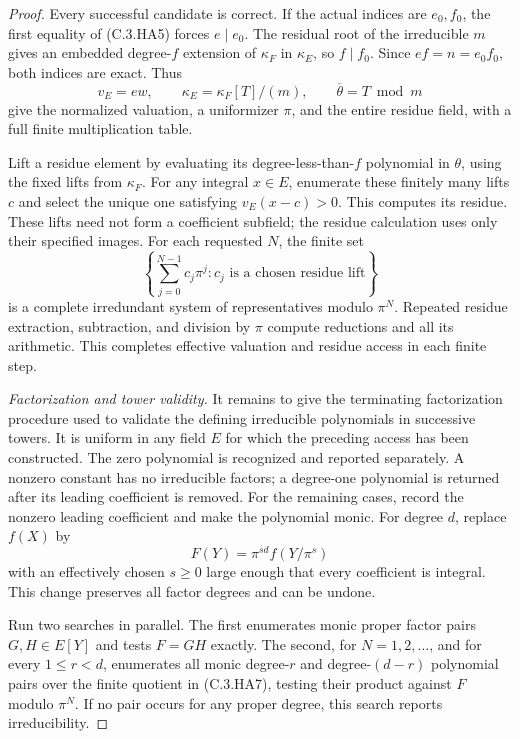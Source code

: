 \begin{proof}
Every successful candidate is correct.
If the actual indices are $e_0,f_0$,
the first equality of (C.3.HA5)
forces $e\mid e_0$.
The residual root of the irreducible
$m$ gives an embedded degree-$f$
extension of $\kappa_F$ in $\kappa_E$,
so $f\mid f_0$.
Since $ef=n=e_0f_0$, both indices
are exact.  Thus
\[
 v_E=e w,\qquad
 \kappa_E=\kappa_F[T]/(m),\qquad
 \overline\theta=T\bmod m                              \tag{C.3.HA6}
\]
give the normalized valuation, a
uniformizer $\pi$, and the entire
residue field, with a full finite
multiplication table.

Lift a residue element by evaluating
its degree-less-than-$f$ polynomial
in $\theta$, using the fixed lifts
from $\kappa_F$.
For any integral $x\in E$, enumerate
these finitely many lifts $c$ and
select the unique one satisfying
$v_E(x-c)>0$.  This computes its
residue.  These lifts need not form
a coefficient subfield; the residue
calculation uses only their specified
images.
For each requested $N$, the finite
set
\[
 \left\{\sum_{j=0}^{N-1}c_j\pi^j:
                 c_j\text{ is a chosen residue lift}\right\}
                                                               \tag{C.3.HA7}
\]
is a complete irredundant system of
representatives modulo $\pi^N$.
Repeated residue extraction, subtraction,
and division by $\pi$ compute reductions
and all its arithmetic.
This completes effective valuation
and residue access in each finite step.

\emph{Factorization and tower validity.}
It remains to give the terminating
factorization procedure used to
validate the defining irreducible
polynomials in successive towers.
It is uniform in any field $E$
for which the preceding access
has been constructed.
The zero polynomial is recognized and
reported separately.  A nonzero constant
has no irreducible factors; a degree-one
polynomial is returned after its leading
coefficient is removed.  For the remaining
cases, record the nonzero leading
coefficient and make the polynomial monic.
For degree $d$, replace $f(X)$ by
\[
             F(Y)=\pi^{sd}f(Y/\pi^s)                    \tag{C.3.HA8}
\]
with an effectively chosen $s\geq0$
large enough that every coefficient
is integral.  This change preserves
all factor degrees and can be undone.

Run two searches in parallel.
The first enumerates monic proper
factor pairs $G,H\in E[Y]$ and
tests $F=GH$ exactly.
The second, for $N=1,2,\ldots$,
and for every $1\leq r<d$,
enumerates all monic degree-$r$
and degree-$(d-r)$ polynomial
pairs over the finite quotient
in (C.3.HA7), testing their
product against $F$ modulo
$\pi^N$.  If no pair occurs
for any proper degree, this
search reports irreducibility.


\end{proof}
